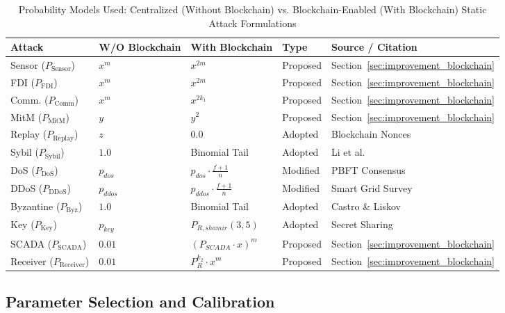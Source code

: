 \documentclass[10pt,twocolumn,journal]{IEEEtran}
\begin{document}
\begin{table}[t]
\caption{Probability Models Used: Centralized (Without Blockchain) vs. Blockchain-Enabled (With Blockchain) Static Attack Formulations}
\label{tab:probability_models}
\centering
\scriptsize
\begin{tabular}{@{}lllll@{}}
\toprule
\textbf{Attack} & \textbf{W/O Blockchain} & \textbf{With Blockchain} & \textbf{Type} & \textbf{Source / Citation} \\
\midrule
Sensor ($P_{\mathrm{Sensor}}$) & $x^m$ & $x^{2m}$ & Proposed & Section~\ref{sec:improvement_blockchain} \\
FDI ($P_{\mathrm{FDI}}$) & $x^m$ & $x^{2m}$ & Proposed & Section~\ref{sec:improvement_blockchain} \\
Comm. ($P_{\mathrm{Comm}}$) & $x^m$ & $x^{2k_1}$ & Proposed & Section~\ref{sec:improvement_blockchain} \\
MitM ($P_{\mathrm{MitM}}$) & $y$ & $y^2$ & Proposed & Section~\ref{sec:improvement_blockchain} \\
Replay ($P_{\mathrm{Replay}}$) & $z$ & $0.0$ & Adopted & Blockchain Nonces~\cite{yan2012} \\
Sybil ($P_{\mathrm{Sybil}}$) & $1.0$ & Binomial Tail & Adopted & Li et al.~\cite{li2020_blockchain} \\
DoS ($P_{\mathrm{DoS}}$) & $p_{dos}$ & $p_{dos} \cdot \frac{f+1}{n}$ & Modified & PBFT Consensus~\cite{castro1999} \\
DDoS ($P_{\mathrm{DDoS}}$) & $p_{ddos}$ & $p_{ddos} \cdot \frac{f+1}{n}$ & Modified & Smart Grid Survey~\cite{wang2013} \\
Byzantine ($P_{\mathrm{Byz}}$) & $1.0$ & Binomial Tail & Adopted & Castro \& Liskov~\cite{castro1999} \\
Key ($P_{\mathrm{Key}}$) & $p_{key}$ & $P_{R,shamir}(3,5)$ & Adopted & Secret Sharing~\cite{sridhar2012} \\
SCADA ($P_{\mathrm{SCADA}}$) & $0.01$ & $(P_{SCADA} \cdot x)^m$ & Proposed & Section~\ref{sec:improvement_blockchain} \\
Receiver ($P_{\mathrm{Receiver}}$) & $0.01$ & $P_R^{k_2} \cdot x^m$ & Proposed & Section~\ref{sec:improvement_blockchain} \\
\bottomrule
\end{tabular}
\end{table}

\subsection{Parameter Selection and Calibration}
\label{sec:parameter_selection}
\end{document}
